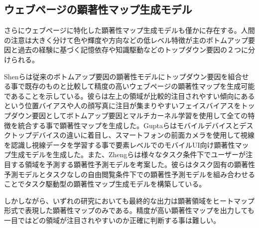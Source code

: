 \subsection{ウェブページの顕著性マップ生成モデル}\label{subsec:related-04}
\par さらにウェブページに特化した顕著性マップ生成モデルも僅かに存在する。人間の注意は大きく分けて色や輝度や方向などの低レベル特徴が主のボトムアップ要因と過去の経験に基づく記憶依存や知識駆動などのトップダウン要因の２つに分けられる。
\par Shenらは従来のボトムアップ要因の顕著性モデルにトップダウン要因を組合せる事で既存のものと比較して精度の高いウェブページの顕著性マップを生成可能であることを示している\cite{shen2014webpage}。彼らは左上の領域が比較的注目されやすい傾向にあるという位置バイアスや人の顔写真に注目が集まりやすいフェイスバイアスをトップダウン要因としてボトムアップ要因とマルチカーネル学習を使用して全ての特徴を統合する事で顕著性マップを生成した。Guptaらはモバイルデバイスとデスクトップデバイスの違いに着目し、スマートフォンの前面カメラを使用して視線を認識し視線データを学習する事で要素レベルでのモバイルUI向け顕著性マップ生成モデルを生成した\cite{Gupta_2018}。また、Zhengらは様々なタスク条件下でユーザーが注目する領域を予測する顕著性予測モデルを考案した。彼らはタスク固有の顕著性予測モデルとタスクなしの自由閲覧条件下での顕著性予測モデルを組み合わせることでタスク駆動型の顕著性マップ生成モデルを構築している\cite{Zheng_task-driven}。

\par しかしながら、いずれの研究においても最終的な出力は顕著領域をヒートマップ形式で表現した顕著性マップのみである。精度が高い顕著性マップを出力しても一目ではどの領域が注目されやすいのか正確に判断する事は難しい。
